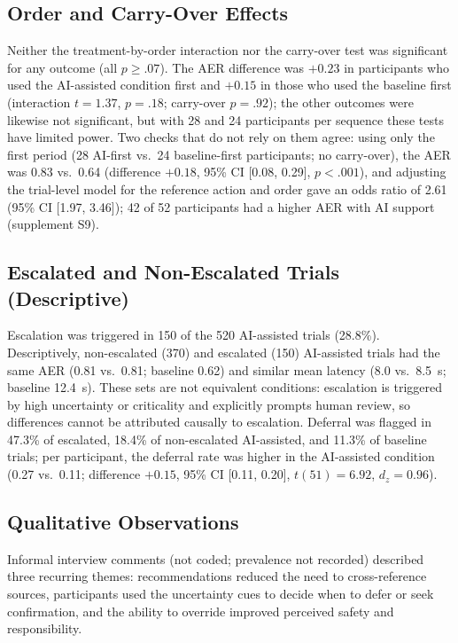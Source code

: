 \documentclass[journal]{IEEEtran}
\theoremstyle{plain}
\theoremstyle{definition}
\begin{document}
    \subsection{Order and Carry-Over Effects}
    \label{sec:res_order}
    Neither the treatment-by-order interaction nor the carry-over test was significant for any outcome (all $p \geq .07$). The AER difference was $+0.23$ in participants who used the AI-assisted condition first and $+0.15$ in those who used the baseline first (interaction $t=1.37$, $p=.18$; carry-over $p=.92$); the other outcomes were likewise not significant, but with 28 and 24 participants per sequence these tests have limited power. Two checks that do not rely on them agree: using only the first period (28 AI-first vs.\ 24 baseline-first participants; no carry-over), the AER was 0.83 vs.\ 0.64 (difference $+0.18$, 95\% CI [0.08, 0.29], $p<.001$), and adjusting the trial-level model for the reference action and order gave an odds ratio of 2.61 (95\% CI [1.97, 3.46]); 42 of 52 participants had a higher AER with AI support (supplement S9).

    \subsection{Escalated and Non-Escalated Trials (Descriptive)}
    \label{sec:res_escalation}
    Escalation was triggered in 150 of the 520 AI-assisted trials (28.8\%). Descriptively, non-escalated (370) and escalated (150) AI-assisted trials had the same AER (0.81 vs.\ 0.81; baseline 0.62) and similar mean latency (8.0 vs.\ 8.5~s; baseline 12.4~s). These sets are not equivalent conditions: escalation is triggered by high uncertainty or criticality and explicitly prompts human review, so differences cannot be attributed causally to escalation. Deferral was flagged in 47.3\% of escalated, 18.4\% of non-escalated AI-assisted, and 11.3\% of baseline trials; per participant, the deferral rate was higher in the AI-assisted condition (0.27 vs.\ 0.11; difference $+0.15$, 95\% CI [0.11, 0.20], $t(51)=6.92$, $d_z=0.96$).



    \subsection{Qualitative Observations}
    Informal interview comments (not coded; prevalence not recorded) described three recurring themes: recommendations reduced the need to cross-reference sources, participants used the uncertainty cues to decide when to defer or seek confirmation, and the ability to override improved perceived safety and responsibility.
\end{document}
